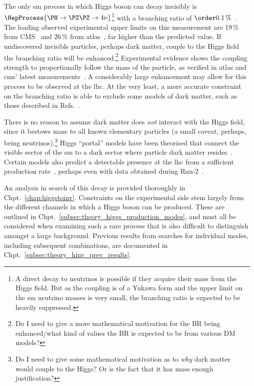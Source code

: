 The only \acrshort{sm} process in which Higgs boson can decay invisibly is $\HepProcess{\PH \to \PZ\PZ \to 4\nu}$\footnote{A direct decay to neutrinos is possible if they acquire their mass from the Higgs field. But as the coupling is of a Yukawa form and the upper limit on the \acrshort{sm} neutrino masses is very small, the branching ratio is expected to be heavily suppressed.} with a branching ratio of $\order{\text{0.1\,\%}}$~\cite{Heinemeyer:1559921}. The leading observed experimental upper limits on this measurement are 19\,\% from CMS~\cite{Sirunyan:2018owy} and 26\,\% from \acrshort{atlas}~\cite{Aaboud:2019rtt}, far higher than the predicted value. If undiscovered invisible particles, perhaps dark matter, couple to the Higgs field the branching ratio will be enhanced.\footnote{Do I need to give a more mathematical motivation for the BR being enhanced/what kind of values the BR is expected to be from various DM models?} Experimental evidence shows the coupling strength to proportionally follow the mass of the particle, as verified in \acrshort{atlas} and \acrshort{cms}' latest measurements~\cite{Sopczak:2708121}. A considerably large enhancement may allow for this process to be observed at the \acrshort{lhc}. At the very least, a more accurate constraint on the branching ratio is able to exclude some models of dark matter, such as those described in Refs.~.

There is no reason to assume dark matter does \emph{not} interact with the Higgs field, since it bestows mass to all known elementary particles (a small caveat, perhaps, being neutrinos).\footnote{Do I need to give some mathematical motivation as to \emph{why} dark matter would couple to the Higgs? Or is the fact that it has mass enough justification?} Higgs ``portal'' models have been theorised that connect the visible sector of the \acrlong{sm} to a dark sector where particle dark matter resides~\cite{higgs_portal_singlet_dm,Arcadi:2019lka}. Certain models also predict a detectable presence at the \acrshort{lhc} from a sufficient production rate~\cite{Boveia:2018yeb}, perhaps even with data obtained during Run-2~\cite{Abercrombie:2015wmb}.


An analysis in search of this decay is provided thoroughly in Chpt.~\ref{chap:higgstoinv}. Constraints on the experimental side stem largely from the different channels in which a Higgs boson can be produced. These are outlined in Chpt.~\ref{subsec:theory_higgs_production_modes}, and must all be considered when examining such a rare process that is also difficult to distinguish amongst a large background. Previous results from searches for individual modes, including subsequent combinations, are documented in Chpt.~\ref{subsec:theory_hinv_prev_results}.


